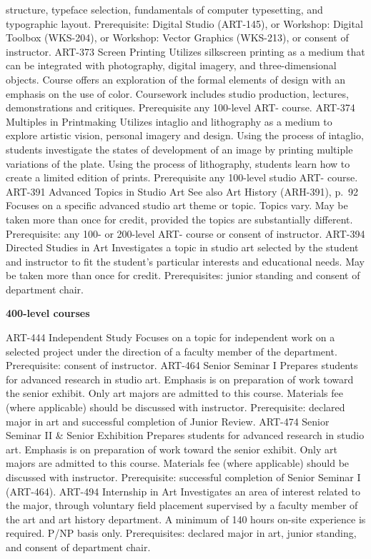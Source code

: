 \documentclass[
  letterpaper,
]{scrbook}
\begin{document}
structure, typeface selection, fundamentals of computer typesetting, and
typographic layout. Prerequisite: Digital Studio (ART-145), or Workshop:
Digital Toolbox (WKS-204), or Workshop: Vector Graphics (WKS-213), or
consent of instructor. ART-373 Screen Printing Utilizes silkscreen
printing as a medium that can be integrated with photography, digital
imagery, and three-dimensional objects. Course offers an exploration of
the formal elements of design with an emphasis on the use of color.
Coursework includes studio production, lectures, demonstrations and
critiques. Prerequisite any 100-level ART- course. ART-374 Multiples in
Printmaking Utilizes intaglio and lithography as a medium to explore
artistic vision, personal imagery and design. Using the process of
intaglio, students investigate the states of development of an image by
printing multiple variations of the plate. Using the process of
lithography, students learn how to create a limited edition of prints.
Prerequisite any 100-level studio ART- course. ART-391 Advanced Topics
in Studio Art See also Art History (ARH-391), p.~92 Focuses on a
specific advanced studio art theme or topic. Topics vary. May be taken
more than once for credit, provided the topics are substantially
different. Prerequisite: any 100- or 200-level ART- course or consent of
instructor. ART-394 Directed Studies in Art Investigates a topic in
studio art selected by the student and instructor to fit the student's
particular interests and educational needs. May be taken more than once
for credit. Prerequisites: junior standing and consent of department
chair.

\textbf{400-level courses}

ART-444 Independent Study Focuses on a topic for independent work on a
selected project under the direction of a faculty member of the
department. Prerequisite: consent of instructor. ART-464 Senior Seminar
I Prepares students for advanced research in studio art. Emphasis is on
preparation of work toward the senior exhibit. Only art majors are
admitted to this course. Materials fee (where applicable) should be
discussed with instructor. Prerequisite: declared major in art and
successful completion of Junior Review. ART-474 Senior Seminar II \&
Senior Exhibition Prepares students for advanced research in studio art.
Emphasis is on preparation of work toward the senior exhibit. Only art
majors are admitted to this course. Materials fee (where applicable)
should be discussed with instructor. Prerequisite: successful completion
of Senior Seminar I (ART-464). ART-494 Internship in Art Investigates an
area of interest related to the major, through voluntary field placement
supervised by a faculty member of the art and art history department. A
minimum of 140 hours on-site experience is required. P/NP basis only.
Prerequisites: declared major in art, junior standing, and consent of
department chair.
\end{document}
